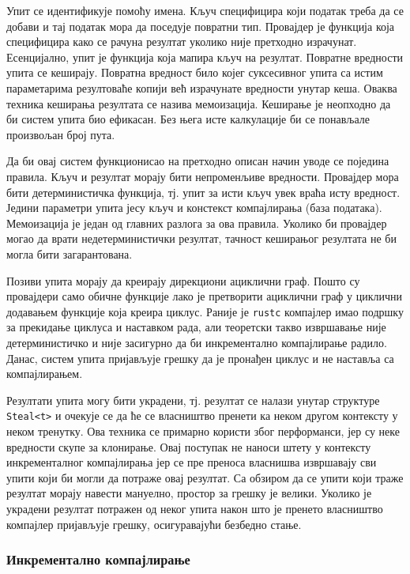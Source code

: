 Упит се идентификује помоћу имена. Кључ специфицира који податак треба да се добави и тај податак 
мора да поседује повратни тип. Провајдер је функција која специфицира како се рачуна резултат уколико није 
претходно израчунат. Есенцијално, упит је функција која мапира кључ на резултат. 
Повратне вредности упита се кеширају. Повратна вредност било којег суксесивног упита са истим параметарима резултоваће 
копији већ израчунате вредности унутар кеша. Оваква техника кеширања резултата се назива мемоизација.
Кеширање је неопходно да би систем упита био ефикасан. Без њега исте калкулације би се понављале произвољан број пута.

Да би овај систем функционисао на претходно описан начин уводе се поједина правила. Кључ и резултат 
морају бити непроменљиве вредности. Провајдер мора бити детерминистичка функција, тј. упит за исти кључ
увек враћа исту вредност. Једини параметри упита јесу кључ и констекст компајлирања (база података).
Мемоизација је један од главних разлога за ова правила. Уколико би провајдер могао да врати недетерминистички резултат,
тачност кеширањог резултата не би могла бити загарантована.

Позиви упита морају да креирају дирекциони ациклични граф. Пошто су провајдери само обичне функције лако је претворити 
ациклични граф у циклични додавањем функције која креира циклус. Раније је \verb|rustc| компајлер имао подршку 
за прекидање циклуса и наставком рада, али теоретски такво извршавање није детерминистичко и није засигурно да би 
инкрементално компајлирање радило. Данас, систем упита пријављује грешку да је пронађен циклус
и не наставља са компајлирањем.

Резултати упита могу бити украдени, тј. резултат се налази унутар структуре \verb|Steal<t>| и очекује се да ће се власништво 
пренети ка неком другом контексту у неком тренутку. Ова техника се примарно користи због перформанси, 
јер су неке вредности скупе за клонирање. Овај поступак не наноси штету у контексту инкременталног компајлирања јер се пре 
преноса власнишва извршавају сви упити који би могли да потраже овај резултат. Са обзиром да се упити који траже резултат 
морају навести мануелно, простор за грешку је велики. Уколико је украдени резултат потражен од неког упита након што је пренето власништво
компајлер пријављује грешку, осигуравајући безбедно стање.

\subsubsection{Инкрементално компајлирање}

